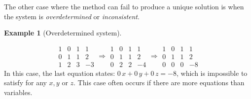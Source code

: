 \documentclass[
  a4paper,
  DIV=11,
  numbers=noendperiod,
  oneside]{scrreprt}
\theoremstyle{definition}
\newtheorem{example}{Example}[chapter]
\theoremstyle{remark}
\begin{document}
The other case where the method can fail to produce a unique solution is
when the system is \emph{overdetermined} or \emph{inconsistent}.

\begin{example}[Overdetermined
system]\protect\hypertarget{exm-ge3}{}\label{exm-ge3}

\[\begin{array}{rrr|r}
  1 & 0& 1 &1 \\
   0& 1 & 1  & 2 \\
    1 & 2 & 3 & -3    
\end{array}
\Rightarrow
\begin{array}{rrr|r}
  1 & 0& 1 &1 \\
   0& 1 & 1  & 2 \\
    0 & 2 & 2 & -4    
\end{array}
\Rightarrow
\begin{array}{rrr|r}
  1 & 0& 1 &1 \\
   0& 1 & 1  & 2 \\
    0 & 0 & 0 & -8    
\end{array}\] In this case, the last equation states:
\(0\, x + 0\, y + 0\, z=-8\), which is impossible to satisfy for any
\(x,y\) or \(z\). This case often occurs if there are more equations
than variables.

\end{example}
\end{document}
